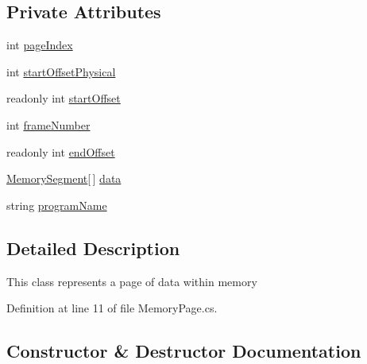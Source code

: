 \subsection*{Private Attributes}
\begin{DoxyCompactItemize}
\item 
int \hyperlink{class_c_p_u___o_s___simulator_1_1_memory_1_1_memory_page_acf60a7bdefab6120fe080854b5f0b38b}{page\+Index}
\item 
int \hyperlink{class_c_p_u___o_s___simulator_1_1_memory_1_1_memory_page_a3cecfb0fe2f91def3db5711180442d44}{start\+Offset\+Physical}
\item 
readonly int \hyperlink{class_c_p_u___o_s___simulator_1_1_memory_1_1_memory_page_a6fe2e28385db19a1968a41efe3df3f38}{start\+Offset}
\item 
int \hyperlink{class_c_p_u___o_s___simulator_1_1_memory_1_1_memory_page_aa2201f66e00641ff4eb07f881ac5413f}{frame\+Number}
\item 
readonly int \hyperlink{class_c_p_u___o_s___simulator_1_1_memory_1_1_memory_page_ae2f8f419909326ce5449d37af9ff7c89}{end\+Offset}
\item 
\hyperlink{class_c_p_u___o_s___simulator_1_1_memory_1_1_memory_segment}{Memory\+Segment}\mbox{[}$\,$\mbox{]} \hyperlink{class_c_p_u___o_s___simulator_1_1_memory_1_1_memory_page_af9ab25101e7920de2344e0fa5ddfaa27}{data}
\item 
string \hyperlink{class_c_p_u___o_s___simulator_1_1_memory_1_1_memory_page_a0607c69f1f03e6c8b63186e0b0f13c3c}{program\+Name}
\end{DoxyCompactItemize}


\subsection{Detailed Description}
This class represents a page of data within memory 



Definition at line 11 of file Memory\+Page.\+cs.



\subsection{Constructor \& Destructor Documentation}
\hypertarget{class_c_p_u___o_s___simulator_1_1_memory_1_1_memory_page_afbd62508d7efb21812708338a3ba96e8}{}
